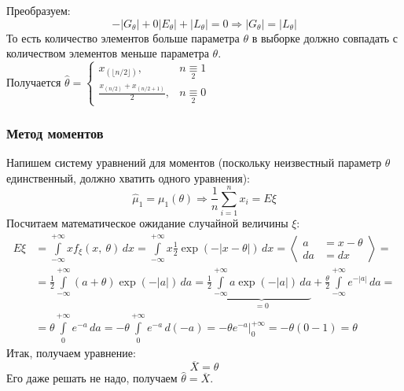 \documentclass[12pt, a4paper]{article}
\begin{document}
Преобразуем:
\begin{equation*}
    -|G_{\theta}| + 0|E_{\theta}| + |L_{\theta}| = 0\Rightarrow |G_{\theta}| = |L_{\theta}|
\end{equation*}
То есть количество элементов больше параметра $\theta$ в выборке должно совпадать с количеством элементов меньше параметра $\theta$.\\

Получается $\hat \theta = \begin{cases}
    x_{(\lfloor n/2 \rfloor)}, & n\underset{2}{\equiv} 1\\
    \frac{x_{(n/2)} + x_{(n/2 + 1)}}{2}, & n\underset{2}{\equiv} 0
\end{cases}$
\subsubsection*{Метод моментов}
Напишем систему уравнений для моментов (поскольку неизвестный параметр $\theta$ единственный, должно хватить одного уравнения):
\begin{equation*}
        \hat\mu_1 = \mu_1(\theta)\Rightarrow \frac{1}{n} \sum_{i = 1}^{n} x_i = E\xi
\end{equation*}
Посчитаем математическое ожидание случайной величины $\xi$:
\begin{equation*}
    \begin{aligned}
        E\xi &= \int\limits_{-\infty}^{+\infty} x f_{\xi}(x,\ \theta)\, dx = \int\limits_{-\infty}^{+\infty} x \frac{1}{2}\exp\left( -|x - \theta|\right)\, dx = \left< \begin{aligned}
            a &= x - \theta\\
            da &= dx
        \end{aligned}  \right> = \\
        &= \frac{1}{2}\int\limits_{-\infty}^{+\infty} (a + \theta)\exp(-|a|)\, da = \frac{1}{2} \underset{=0}{\underbrace{\int\limits_{-\infty}^{+\infty}a\exp(-|a|)\, da}} + \frac{\theta}{2}\int\limits_{-\infty}^{+\infty} e^{-|a|}\, da =\\
        &= \theta \int\limits_{0}^{+\infty} e^{-a}\, da = -\theta \int\limits_0^{+\infty} e^{-a}\, d(-a) = -\theta e^{-a}\Big|_0^{+\infty} = -\theta (0 - 1) = \theta
    \end{aligned}
\end{equation*}
Итак, получаем уравнение:
\begin{equation*}
    \overline{X} = \theta
\end{equation*}
Его даже решать не надо, получаем $\hat\theta = \overline{X}$.\\
\end{document}
